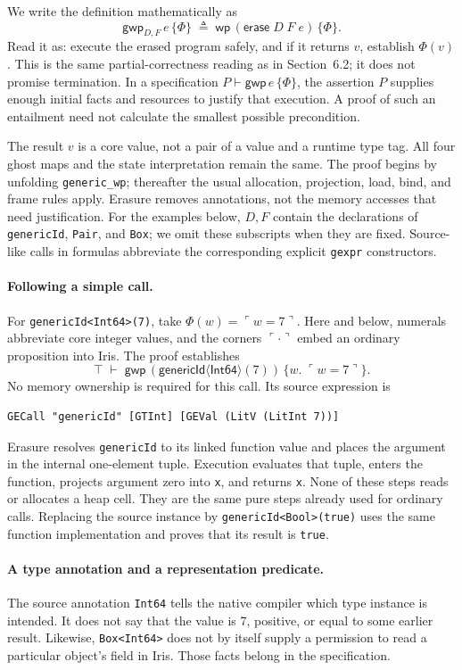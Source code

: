 \documentclass[11pt]{article}
\newcommand{\Wpre}{\mathsf{wp}}
\newcommand{\GWpre}{\mathsf{gwp}}
\newcommand{\pure}[1]{\ulcorner #1 \urcorner}
\begin{document}
We write the definition mathematically as
\[
\GWpre_{D,F}\,e\,\{\Phi\}
\;\triangleq\;
\Wpre\,(\mathsf{erase}\;D\;F\;e)\,\{\Phi\}.
\]
Read it as: execute the erased program safely, and if it returns \(v\),
establish \(\Phi(v)\). This is the same partial-correctness reading as
in Section~6.2; it does not promise termination. In a specification
\(P\vdash\GWpre\,e\,\{\Phi\}\), the assertion \(P\) supplies
enough initial facts and resources to justify that execution. A proof of
such an entailment need not calculate the smallest possible precondition.

The result \(v\) is a core value, not a pair of a value and a runtime
type tag. All four ghost maps and the state interpretation remain the
same. The proof begins by unfolding \texttt{generic\_wp}; thereafter
the usual allocation, projection, load, bind, and frame rules apply.
Erasure removes annotations, not the memory accesses that need justification.
For the examples below, \(D,F\) contain the declarations of
\texttt{genericId}, \texttt{Pair}, and \texttt{Box}; we omit these
subscripts when they are fixed. Source-like calls in formulas abbreviate
the corresponding explicit \texttt{gexpr} constructors.

\paragraph{Following a simple call.}
For \texttt{genericId<Int64>(7)}, take
\(\Phi(w)=\pure{w=7}\). Here and below, numerals abbreviate core
integer values, and the corners \(\pure{\cdot}\) embed an ordinary
proposition into Iris. The proof establishes
\[
\top\;\vdash\;
\GWpre\,(\mathsf{genericId}\langle\mathsf{Int64}\rangle(7))
  \,\{w.\;\pure{w=7}\}.
\]
No memory ownership is required for this call. Its source expression is
\begin{lstlisting}
GECall "genericId" [GTInt] [GEVal (LitV (LitInt 7))]
\end{lstlisting}
Erasure resolves \texttt{genericId} to its linked function value and
places the argument in the internal one-element tuple. Execution evaluates
that tuple, enters the function, projects argument zero into \texttt{x},
and returns \texttt{x}. None of these steps reads or allocates a heap cell.
They are the same pure steps already used for ordinary calls. Replacing
the source instance by \texttt{genericId<Bool>(true)} uses the same
function implementation and proves that its result is \texttt{true}.

\paragraph{A type annotation and a representation predicate.}
The source annotation \texttt{Int64} tells the native compiler which
type instance is intended. It does not say that the value is 7, positive,
or equal to some earlier result. Likewise, \texttt{Box<Int64>} does not
by itself supply a permission to read a particular object's field in Iris.
Those facts belong in the specification.
\end{document}
